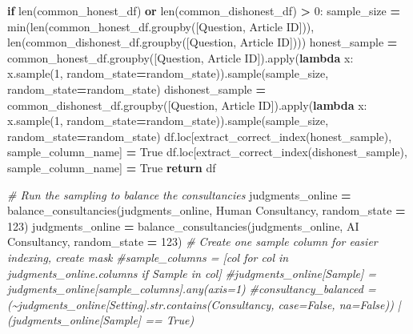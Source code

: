 \documentclass[
]{article}
\newenvironment{Shaded}{\begin{snugshade}}{\end{snugshade}}
\newcommand{\BuiltInTok}[1]{#1}
\newcommand{\CommentTok}[1]{\textcolor[rgb]{0.56,0.35,0.01}{\textit{#1}}}
\newcommand{\ControlFlowTok}[1]{\textcolor[rgb]{0.13,0.29,0.53}{\textbf{#1}}}
\newcommand{\DecValTok}[1]{\textcolor[rgb]{0.00,0.00,0.81}{#1}}
\newcommand{\KeywordTok}[1]{\textcolor[rgb]{0.13,0.29,0.53}{\textbf{#1}}}
\newcommand{\NormalTok}[1]{#1}
\newcommand{\OperatorTok}[1]{\textcolor[rgb]{0.81,0.36,0.00}{\textbf{#1}}}
\newcommand{\StringTok}[1]{\textcolor[rgb]{0.31,0.60,0.02}{#1}}
\newcommand{\VariableTok}[1]{\textcolor[rgb]{0.00,0.00,0.00}{#1}}
\begin{document}
\begin{Shaded}
\begin{Highlighting}[]
    \ControlFlowTok{if} \BuiltInTok{len}\NormalTok{(common\_honest\_df) }\KeywordTok{or} \BuiltInTok{len}\NormalTok{(common\_dishonest\_df) }\OperatorTok{\textgreater{}} \DecValTok{0}\NormalTok{:}
\NormalTok{        sample\_size }\OperatorTok{=} \BuiltInTok{min}\NormalTok{(}\BuiltInTok{len}\NormalTok{(common\_honest\_df.groupby([}\StringTok{\textquotesingle{}Question\textquotesingle{}}\NormalTok{, }\StringTok{\textquotesingle{}Article ID\textquotesingle{}}\NormalTok{])), }\BuiltInTok{len}\NormalTok{(common\_dishonest\_df.groupby([}\StringTok{\textquotesingle{}Question\textquotesingle{}}\NormalTok{, }\StringTok{\textquotesingle{}Article ID\textquotesingle{}}\NormalTok{])))}
\NormalTok{        honest\_sample }\OperatorTok{=}\NormalTok{ common\_honest\_df.groupby([}\StringTok{\textquotesingle{}Question\textquotesingle{}}\NormalTok{, }\StringTok{\textquotesingle{}Article ID\textquotesingle{}}\NormalTok{]).}\BuiltInTok{apply}\NormalTok{(}\KeywordTok{lambda}\NormalTok{ x: x.sample(}\DecValTok{1}\NormalTok{, random\_state}\OperatorTok{=}\NormalTok{random\_state)).sample(sample\_size, random\_state}\OperatorTok{=}\NormalTok{random\_state)}
\NormalTok{        dishonest\_sample }\OperatorTok{=}\NormalTok{ common\_dishonest\_df.groupby([}\StringTok{\textquotesingle{}Question\textquotesingle{}}\NormalTok{, }\StringTok{\textquotesingle{}Article ID\textquotesingle{}}\NormalTok{]).}\BuiltInTok{apply}\NormalTok{(}\KeywordTok{lambda}\NormalTok{ x: x.sample(}\DecValTok{1}\NormalTok{, random\_state}\OperatorTok{=}\NormalTok{random\_state)).sample(sample\_size, random\_state}\OperatorTok{=}\NormalTok{random\_state)}
\NormalTok{        df.loc[extract\_correct\_index(honest\_sample), sample\_column\_name] }\OperatorTok{=} \VariableTok{True}
\NormalTok{        df.loc[extract\_correct\_index(dishonest\_sample), sample\_column\_name] }\OperatorTok{=} \VariableTok{True}
    \ControlFlowTok{return}\NormalTok{ df}


\CommentTok{\# Run the sampling to balance the consultancies}
\NormalTok{judgments\_online }\OperatorTok{=}\NormalTok{ balance\_consultancies(judgments\_online, }\StringTok{\textquotesingle{}Human Consultancy\textquotesingle{}}\NormalTok{, random\_state }\OperatorTok{=} \DecValTok{123}\NormalTok{)}
\NormalTok{judgments\_online }\OperatorTok{=}\NormalTok{ balance\_consultancies(judgments\_online, }\StringTok{\textquotesingle{}AI Consultancy\textquotesingle{}}\NormalTok{, random\_state }\OperatorTok{=} \DecValTok{123}\NormalTok{)}
\CommentTok{\# Create one sample column for easier indexing, create mask}
\CommentTok{\#sample\_columns = [col for col in judgments\_online.columns if \textquotesingle{}Sample\textquotesingle{} in col]}
\CommentTok{\#judgments\_online[\textquotesingle{}Sample\textquotesingle{}] = judgments\_online[sample\_columns].any(axis=1)}
\CommentTok{\#consultancy\_balanced = (\textasciitilde{}judgments\_online[\textquotesingle{}Setting\textquotesingle{}].str.contains(\textquotesingle{}Consultancy\textquotesingle{}, case=False, na=False)) | (judgments\_online[\textquotesingle{}Sample\textquotesingle{}] == True)}


\end{Highlighting}
\end{Shaded}
\end{document}
